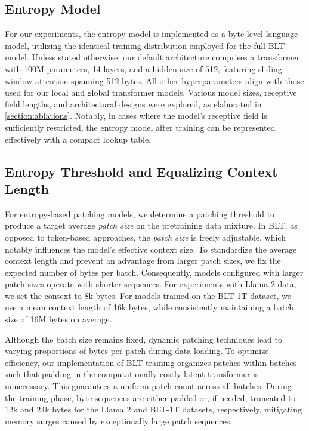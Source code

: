 \subsection{Entropy Model} For our experiments, the entropy model is implemented as a byte-level language model, utilizing the identical training distribution employed for the full {\textsc BLT} model. Unless stated otherwise, our default architecture comprises a transformer with 100M parameters, 14 layers, and a hidden size of 512, featuring sliding window attention spanning 512 bytes. All other hyperparameters align with those used for our local and global transformer models. Various model sizes, receptive field lengths, and architectural designs were explored, as elaborated in \autoref{section:ablations}. Notably, in cases where the model's receptive field is sufficiently restricted, the entropy model after training can be represented effectively with a compact lookup table.

\subsection{Entropy Threshold and Equalizing Context Length} For entropy-based patching models, we determine a patching threshold to produce a target average \textit{patch size} on the pretraining data mixture. In {\textsc BLT}, as opposed to token-based approaches, the \textit{patch size} is freely adjustable, which notably influences the model’s effective context size. To standardize the average context length and prevent an advantage from larger patch sizes, we fix the expected number of bytes per batch. Consequently, models configured with larger patch sizes operate with shorter sequences. For experiments with Llama 2 data, we set the context to 8k bytes. For models trained on the {\textsc BLT}-1T dataset, we use a mean context length of 16k bytes, while consistently maintaining a batch size of 16M bytes on average.

Although the batch size remains fixed, dynamic patching techniques lead to varying proportions of bytes per patch during data loading. To optimize efficiency, our implementation of {\textsc BLT} training organizes patches within batches such that padding in the computationally costly latent transformer is unnecessary. This guarantees a uniform patch count across all batches. During the training phase, byte sequences are either padded or, if needed, truncated to 12k and 24k bytes for the Llama 2 and {\textsc BLT}-1T datasets, respectively, mitigating memory surges caused by exceptionally large patch sequences.

